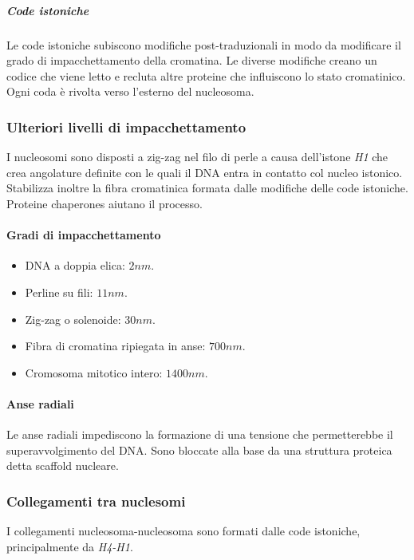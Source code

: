 				\subparagraph{Code istoniche}
				Le code istoniche subiscono modifiche post-traduzionali in modo da modificare il grado di impacchettamento della cromatina.
				Le diverse modifiche creano un codice che viene letto e recluta altre proteine che influiscono lo stato cromatinico.
				Ogni coda \`e rivolta verso l'esterno del nucleosoma.

		\subsubsection{Ulteriori livelli di impacchettamento}
		I nucleosomi sono disposti a zig-zag nel filo di perle a causa dell'istone \emph{H1} che crea angolature definite con le quali il DNA entra in contatto col nucleo istonico.
		Stabilizza inoltre la fibra cromatinica formata dalle modifiche delle code istoniche.
		Proteine chaperones aiutano il processo.
			
			\paragraph{Gradi di impacchettamento}
			\begin{multicols}{2}
				\begin{itemize}
					\item DNA a doppia elica: $2\si{nm}$.
					\item Perline su fili: $11\si{nm}$.
					\item Zig-zag o solenoide: $30\si{nm}$.
					\item Fibra di cromatina ripiegata in anse: $700\si{nm}$.
					\item Cromosoma mitotico intero: $1400\si{nm}$.
				\end{itemize}
			\end{multicols}
			
			\paragraph{Anse radiali}
			Le anse radiali impediscono la formazione di una tensione che permetterebbe il superavvolgimento del DNA.
			Sono bloccate alla base da una struttura proteica detta scaffold nucleare.

		\subsubsection{Collegamenti tra nuclesomi}
		I collegamenti nucleosoma-nucleosoma sono formati dalle code istoniche, principalmente da \emph{H4-H1}.

